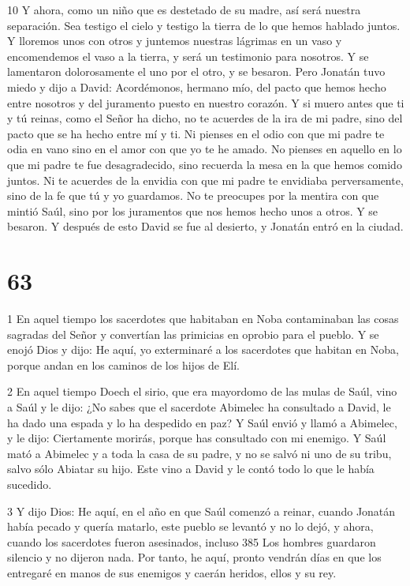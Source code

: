 \par 10 Y ahora, como un niño que es destetado de su madre, así será nuestra separación. Sea testigo el cielo y testigo la tierra de lo que hemos hablado juntos. Y lloremos unos con otros y juntemos nuestras lágrimas en un vaso y encomendemos el vaso a la tierra, y será un testimonio para nosotros. Y se lamentaron dolorosamente el uno por el otro, y se besaron. Pero Jonatán tuvo miedo y dijo a David: Acordémonos, hermano mío, del pacto que hemos hecho entre nosotros y del juramento puesto en nuestro corazón. Y si muero antes que ti y tú reinas, como el Señor ha dicho, no te acuerdes de la ira de mi padre, sino del pacto que se ha hecho entre mí y ti. Ni pienses en el odio con que mi padre te odia en vano sino en el amor con que yo te he amado. No pienses en aquello en lo que mi padre te fue desagradecido, sino recuerda la mesa en la que hemos comido juntos. Ni te acuerdes de la envidia con que mi padre te envidiaba perversamente, sino de la fe que tú y yo guardamos. No te preocupes por la mentira con que mintió Saúl, sino por los juramentos que nos hemos hecho unos a otros. Y se besaron. Y después de esto David se fue al desierto, y Jonatán entró en la ciudad.

\chapter{63}

\par 1 En aquel tiempo los sacerdotes que habitaban en Noba contaminaban las cosas sagradas del Señor y convertían las primicias en oprobio para el pueblo. Y se enojó Dios y dijo: He aquí, yo exterminaré a los sacerdotes que habitan en Noba, porque andan en los caminos de los hijos de Elí.

\par 2 En aquel tiempo Doech el sirio, que era mayordomo de las mulas de Saúl, vino a Saúl y le dijo: ¿No sabes que el sacerdote Abimelec ha consultado a David, le ha dado una espada y lo ha despedido en paz? Y Saúl envió y llamó a Abimelec, y le dijo: Ciertamente morirás, porque has consultado con mi enemigo. Y Saúl mató a Abimelec y a toda la casa de su padre, y no se salvó ni uno de su tribu, salvo sólo Abiatar su hijo. Este vino a David y le contó todo lo que le había sucedido.

\par 3 Y dijo Dios: He aquí, en el año en que Saúl comenzó a reinar, cuando Jonatán había pecado y quería matarlo, este pueblo se levantó y no lo dejó, y ahora, cuando los sacerdotes fueron asesinados, incluso 385 Los hombres guardaron silencio y no dijeron nada. Por tanto, he aquí, pronto vendrán días en que los entregaré en manos de sus enemigos y caerán heridos, ellos y su rey.

